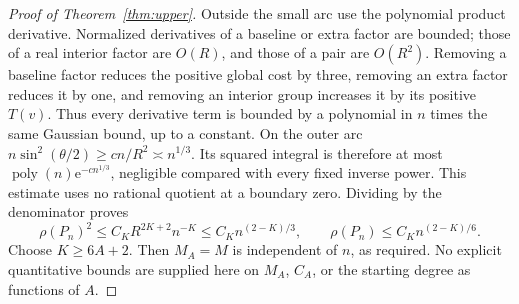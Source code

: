 \documentclass[11pt]{article}
\theoremstyle{remark}\newtheorem{remark}[theorem]{Remark}
\newcommand{\ee}{\mathrm e}
\begin{document}
\begin{proof}[Proof of Theorem~\ref{thm:upper}]
Outside the small arc use the polynomial product derivative.
Normalized derivatives of a baseline or extra factor are bounded;
those of a real interior factor are \(O(R)\), and those of a pair
are \(O(R^2)\). Removing a baseline factor reduces the positive
global cost by three, removing an extra factor reduces it by one,
and removing an interior group increases it by its positive \(T(v)\).
Thus every derivative term is bounded by a polynomial in \(n\)
times the same Gaussian bound, up to a constant. On the outer arc
\(n\sin^2(\theta/2)\ge c n/R^2\asymp n^{1/3}\).
Its squared integral is therefore at most
\(\operatorname{poly}(n)\ee^{-c n^{1/3}}\), negligible compared
with every fixed inverse power. This estimate uses no rational
quotient at a boundary zero. Dividing by the denominator proves
\[
 \rho(P_n)^2\le C_K R^{2K+2}n^{-K}
 \le C_K n^{(2-K)/3},\qquad
 \rho(P_n)\le C_K n^{(2-K)/6}.
\]
Choose \(K\ge6A+2\). Then \(M_A=M\) is independent of \(n\),
as required. No explicit quantitative bounds are supplied here on \(M_A\),
\(C_A\), or the starting degree as functions of \(A\).
\end{proof}
\end{document}
